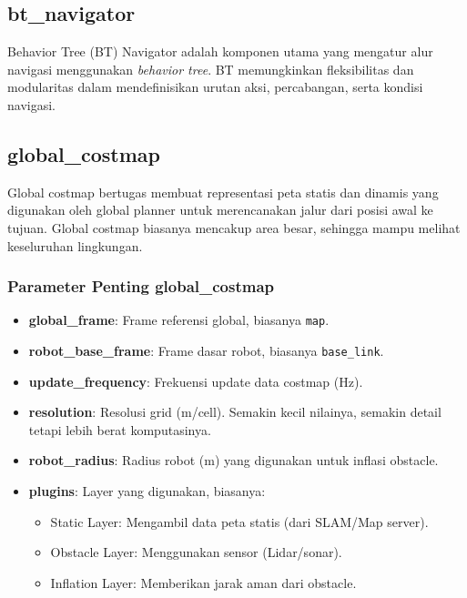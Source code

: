 \documentclass{article}
\begin{document}
\subsection{bt\_navigator}
Behavior Tree (BT) Navigator adalah komponen utama yang mengatur alur navigasi menggunakan \textit{behavior tree}. BT memungkinkan fleksibilitas dan modularitas dalam mendefinisikan urutan aksi, percabangan, serta kondisi navigasi.

\subsection{global\_costmap}
Global costmap bertugas membuat representasi peta statis dan dinamis yang digunakan oleh global planner untuk merencanakan jalur dari posisi awal ke tujuan. Global costmap biasanya mencakup area besar, sehingga mampu melihat keseluruhan lingkungan.

\subsubsection*{Parameter Penting global\_costmap}
\begin{itemize}
  \item \textbf{global\_frame}: Frame referensi global, biasanya \texttt{map}.
  \item \textbf{robot\_base\_frame}: Frame dasar robot, biasanya \texttt{base\_link}.
  \item \textbf{update\_frequency}: Frekuensi update data costmap (Hz).
  \item \textbf{resolution}: Resolusi grid (m/cell). Semakin kecil nilainya, semakin detail tetapi lebih berat komputasinya.
  \item \textbf{robot\_radius}: Radius robot (m) yang digunakan untuk inflasi obstacle.
  \item \textbf{plugins}: Layer yang digunakan, biasanya:
        \begin{itemize}
          \item Static Layer: Mengambil data peta statis (dari SLAM/Map server).
          \item Obstacle Layer: Menggunakan sensor (Lidar/sonar).
          \item Inflation Layer: Memberikan jarak aman dari obstacle.
        \end{itemize}
\end{itemize}
\end{document}
